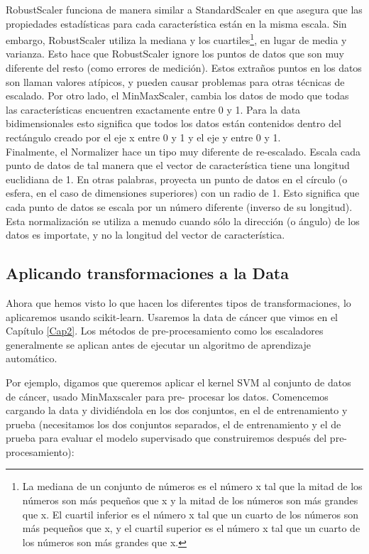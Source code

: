 {\ttfamily RobustScaler} funciona de manera similar a {\ttfamily StandardScaler}  en
que asegura que las propiedades estadísticas para cada característica están en la 
misma escala.  Sin embargo, {\ttfamily RobustScaler} utiliza la mediana y los cuartiles\footnote{\scriptsize	  La mediana de un conjunto de números es el número x tal que la mitad de los números son más pequeños que x y la mitad de los números son más grandes que x. El cuartil inferior es el número x tal que un cuarto de los números son más pequeños que x, y el cuartil superior es el número x tal que un cuarto de los números son más grandes que x.},  en lugar de
media y varianza. Esto hace que  {\ttfamily  RobustScaler} ignore los puntos de datos que son muy
diferente del resto (como errores de medición).  Estos extraños  puntos en los  datos  son llaman valores atípicos, y pueden causar problemas para otras técnicas de escalado.    Por otro lado, el {\ttfamily MinMaxScaler}, cambia los datos de modo que todas las características encuentren exactamente entre 0 y 1.    Para la data bidimensionales esto significa que todos los datos están contenidos dentro del rectángulo creado por el eje x entre 0 y 1 y el eje y entre 0 y 1. \\


Finalmente, el {\ttfamily Normalizer}  hace un tipo muy diferente de re-escalado.  Escala cada punto de datos de tal manera que el vector de característica tiene una longitud euclidiana de 1. En otras palabras, proyecta un punto de datos en el círculo (o esfera, en el caso de dimensiones superiores) con un radio de 1. Esto significa que cada punto de datos se escala por un número diferente (inverso de su longitud). Esta normalización se utiliza a menudo cuando sólo la dirección (o ángulo) de los datos es importate,  y no la longitud del vector de característica.


\subsection{Aplicando transformaciones a la Data}


Ahora que hemos visto lo que hacen los diferentes tipos de transformaciones,  lo aplicaremos  usando  {\ttfamily scikit-learn}.  Usaremos la data de cáncer que vimos en el Capítulo \ref{Cap2}. Los métodos de pre-procesamiento como los escaladores generalmente se aplican  antes de ejecutar un algoritmo  de aprendizaje automático. 

Por ejemplo, digamos que queremos aplicar el kernel SVM  al conjunto de datos de cáncer,  usado {\ttfamily MinMaxscaler} para pre- procesar los datos. Comencemos cargando la data y dividiéndola en los dos conjuntos,  en el de entrenamiento y  prueba (necesitamos los dos conjuntos separados, el de  entrenamiento y el de prueba para evaluar el modelo supervisado que construiremos después del pre-procesamiento):\\

